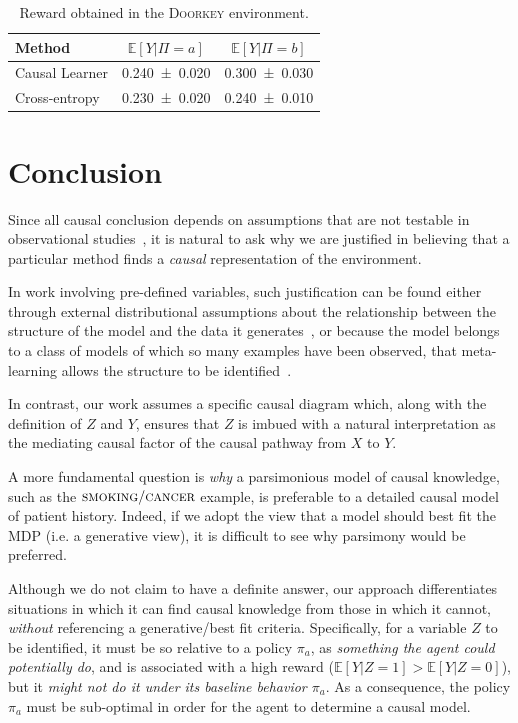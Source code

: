 \documentclass[letterpaper]{article} %
\newcommand{\EE}{\mathbb{E}}
\newcommand{\doorkey}{\textsc{Doorkey}\xspace}
\begin{document}
	
	\begin{table}
		\centering
\begin{tabular}{ lcc }
	\toprule Method
	&  $\mathbb{E}[Y| \Pi=a ]$
	&  $\mathbb{E}[Y| \Pi=b ]$
	\\ \midrule Causal Learner
	&  \SI{0.240\pm 0.020}{}
	&  \SI{0.300\pm 0.030}{}
	\\  Cross-entropy
	&  \SI{0.230\pm 0.020}{}
	&  \SI{0.240\pm 0.010}{}
	\\ \bottomrule\end{tabular}
		\caption{Reward obtained in the \doorkey environment.}\label{tbl_13}
	\end{table}
	
	\section{Conclusion} \label{conclusion}
	Since all causal conclusion depends on assumptions that are not testable in observational studies~\cite{pearl2009causal}, it is natural to ask why we are justified in believing that a particular method finds a \emph{causal} representation of the environment. 
	
	In work involving pre-defined variables, such justification can be found either through external distributional assumptions about the relationship between the structure of the model and the data it generates~\cite{spirtes2000causation}, or because the model belongs to a class of models of which so many examples have been observed, that meta-learning allows the structure to be identified~\cite{dasgupta2019causal}. 
	
	
	
	
	
	In contrast, our work assumes a specific causal diagram which, along with the definition of $Z$ and $Y$, ensures that $Z$ is imbued with a natural interpretation as the mediating causal factor of the causal pathway from $X$ to $Y$.
	
	A more fundamental question is \emph{why} a parsimonious model of causal knowledge, such as the $\textsc{smoking}/\textsc{cancer}$ example, is preferable to a detailed causal model of patient history. Indeed, if we adopt the view that a model should best fit the MDP (i.e. a generative view), it is difficult to see why parsimony would be preferred. 
	
	Although we do not claim to have a definite answer, our approach differentiates situations in which it can find causal knowledge from those in which it cannot, \emph{without} referencing a generative/best fit criteria. Specifically, for a variable $Z$ to be identified, it must be so relative to a policy $\pi_a$, as \emph{something the agent could potentially do}, and is associated with a high reward ($\EE[Y|Z=1] > \EE[Y|Z=0]$), but it \emph{might not do it under its baseline behavior $\pi_a$}. As a consequence, the policy $\pi_a$ must be sub-optimal in order for the agent to determine a causal model. 
	
\end{document}
